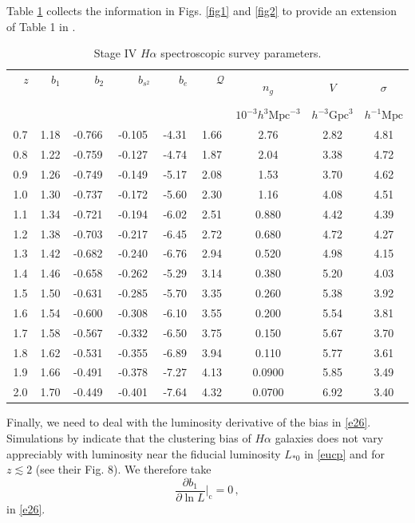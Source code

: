 Table \ref{tab1} collects the information in Figs. \ref{fig1} and \ref{fig2} to provide an extension of Table  1 in \cite{Yankelevich:2018uaz}.
\begin{table}[!ht] 
\centering 
\caption{Stage IV $H\alpha$ spectroscopic survey parameters.} \label{tab1} 
\vspace*{0.2cm}
\begin{tabular}{|c|c|c|c|c|c|c|c|c|} 
\hline 
~~$z$~~ & ~~$b_{1}$~~ & ~~~~$b_{2}$~~~~ & ~~~~$b_{s^{2}}$~~~~ & ~~~$b_{e}$~~~ & ~~~$\mathcal{Q}$~~~ & $n_{g}$ & $V$ & $\sigma$ \\ 
 & & & & & & $10^{-3}h^{3} \mathrm{Mpc}^{-3}$ & $h^{-3} \mathrm{Gpc}^{3}$ & $h^{-1} \mathrm{Mpc}$\\
\hline\hline 
0.7 & 1.18 & -0.766 & -0.105 & -4.31 & 1.66 & 2.76 & 2.82 & 4.81 \\
0.8 & 1.22 & -0.759 & -0.127 & -4.74 & 1.87 & 2.04 & 3.38 & 4.72 \\
0.9 & 1.26 & -0.749 & -0.149 & -5.17 & 2.08 & 1.53 & 3.70 & 4.62 \\
1.0 & 1.30 & -0.737 & -0.172 & -5.60 & 2.30 & 1.16 & 4.08 & 4.51 \\
1.1 & 1.34 & -0.721 & -0.194 & -6.02 & 2.51 & 0.880 & 4.42 & 4.39 \\
1.2 & 1.38 & -0.703 & -0.217 & -6.45 & 2.72 & 0.680 & 4.72 & 4.27 \\
1.3 & 1.42 & -0.682 & -0.240 & -6.76 & 2.94 & 0.520 & 4.98 & 4.15 \\
1.4 & 1.46 & -0.658 & -0.262 & -5.29 & 3.14 & 0.380 & 5.20 & 4.03 \\
1.5 & 1.50 & -0.631 & -0.285 & -5.70 & 3.35 & 0.260 & 5.38 & 3.92 \\
1.6 & 1.54 & -0.600 & -0.308 & -6.10 & 3.55 & 0.200 & 5.54 & 3.81 \\
1.7 & 1.58 & -0.567 & -0.332 & -6.50 & 3.75 & 0.150 & 5.67 & 3.70 \\
1.8 & 1.62 & -0.531 & -0.355 & -6.89 & 3.94 & 0.110 & 5.77 & 3.61 \\
1.9 & 1.66 & -0.491 & -0.378 & -7.27 & 4.13 & 0.0900 & 5.85 & 3.49 \\
2.0 & 1.70 & -0.449 & -0.401 & -7.64 & 4.32 & 0.0700 & 6.92 & 3.40 \\ \hline
\end{tabular}
\end{table}

Finally, we need to deal with the luminosity derivative of the bias in \eqref{e26}. Simulations by \cite{Pan:2019dxa} indicate that the  clustering bias of $H\alpha$ galaxies does not vary appreciably with luminosity near the fiducial luminosity $L_{*0}$ in \eqref{eucp} and for $z\lesssim 2$ (see their Fig. 8). We therefore take
\begin{equation}\label{b1l}
\frac{\partial b_1}{\partial \ln{L}}\bigg|_{\mathrm{c}}=0\,, 
\end{equation}
in \eqref{e26}. 



